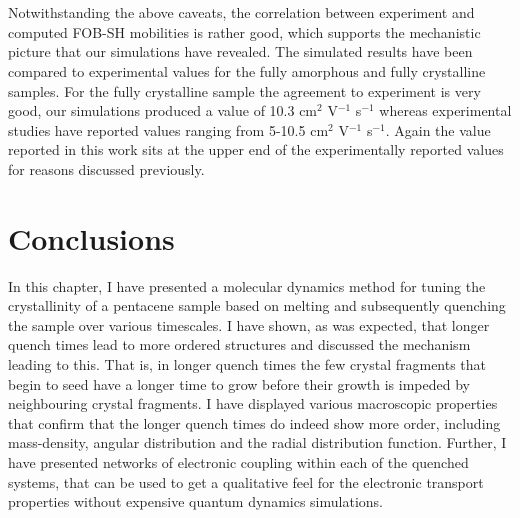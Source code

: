 \\\\
Notwithstanding the above caveats, the correlation between experiment and computed FOB-SH mobilities is rather good, which supports the mechanistic picture that our simulations have revealed. The simulated results have been compared to experimental values for the fully amorphous and fully crystalline samples. For the fully crystalline sample the agreement to experiment is very good, our simulations produced a value of 10.3 cm$^2$ V$^{-1}$ s$^{-1}$ whereas experimental studies have reported values ranging from 5-10.5 cm$^2$ V$^{-1}$ s$^{-1}$. Again the value reported in this work sits at the upper end of the experimentally reported values for reasons discussed previously.

\section{Conclusions}
In this chapter, I have presented a molecular dynamics method for tuning the crystallinity of a pentacene sample based on melting and subsequently quenching the sample over various timescales. I have shown, as was expected, that longer quench times lead to more ordered structures and discussed the mechanism leading to this. That is, in longer quench times the few crystal fragments that begin to seed have a longer time to grow before their growth is impeded by neighbouring crystal fragments. I have displayed various macroscopic properties that confirm that the longer quench times do indeed show more order, including mass-density, angular distribution and the radial distribution function. Further, I have presented networks of electronic coupling within each of the quenched systems, that can be used to get a qualitative feel for the electronic transport properties without expensive quantum dynamics simulations.
\\\\
